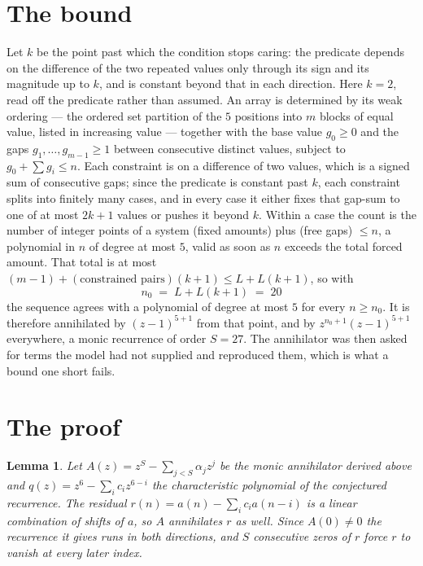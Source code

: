 \documentclass[11pt,a4paper]{article}
\theoremstyle{plain}
\newtheorem{lemma}[theorem]{Lemma}
\theoremstyle{definition}
\begin{document}
\section{The bound}

Let $k$ be the point past which the condition stops caring: the predicate depends on the
difference of the two repeated values only through its sign and its magnitude up to $k$, and is
constant beyond that in each direction. Here $k=2$, read off the predicate rather than
assumed. An array is determined by its weak ordering --- the ordered set partition of the
$5$ positions into $m$ blocks of equal value, listed in increasing value --- together with
the base value $g_0\ge0$ and the gaps $g_1,\dots,g_{m-1}\ge1$ between consecutive distinct
values, subject to $g_0+\sum g_i\le n$. Each constraint is on a difference of two values, which
is a signed sum of consecutive gaps; since the predicate is constant past $k$, each constraint
splits into finitely many cases, and in every case it either fixes that gap-sum to one of at
most $2k+1$ values or pushes it beyond $k$. Within a case the count is the number of integer
points of a system (fixed amounts) plus (free gaps) $\le n$, a polynomial in $n$ of degree at
most $5$, valid as soon as $n$ exceeds the total forced amount. That total is at most
$(m-1)+(\text{constrained pairs})(k+1)\le L+L(k+1)$, so with
\[
n_0 \;=\; L + L(k+1) \;=\; 20
\]
the sequence agrees with a polynomial of degree at most $5$ for every $n\ge n_0$. It is
therefore annihilated by $(z-1)^{5+1}$ from that point, and by $z^{n_0+1}(z-1)^{5+1}$
everywhere, a monic recurrence of order $S=27$. The annihilator was then asked for terms the
model had not supplied and reproduced them, which is what a bound one short fails.

\section{The proof}

\begin{lemma}\label{lem:crit}
Let $A(z)=z^S-\sum_{j<S}\alpha_jz^{j}$ be the monic annihilator derived above and
$q(z)=z^{6}-\sum_ic_iz^{6-i}$ the characteristic polynomial of the conjectured
recurrence. The residual $r(n)=a(n)-\sum_ic_ia(n-i)$ is a linear combination of shifts of $a$,
so $A$ annihilates $r$ as well. Since $A(0)\ne0$ the recurrence it gives runs in both
directions, and $S$ consecutive zeros of $r$ force $r$ to vanish at every later index.
\end{lemma}
\end{document}
